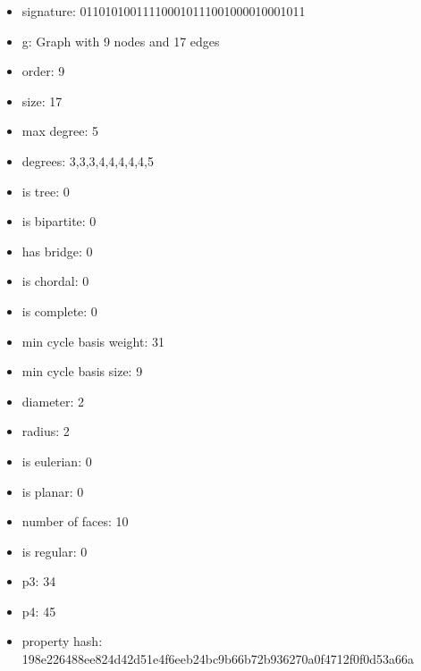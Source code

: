 \newpage
\begin{figure}
\end{figure}
\begin{itemize}
\item signature: 011010100111100010111001000010001011
\item g: Graph with 9 nodes and 17 edges
\item order: 9
\item size: 17
\item max degree: 5
\item degrees: 3,3,3,4,4,4,4,4,5
\item is tree: 0
\item is bipartite: 0
\item has bridge: 0
\item is chordal: 0
\item is complete: 0
\item min cycle basis weight: 31
\item min cycle basis size: 9
\item diameter: 2
\item radius: 2
\item is eulerian: 0
\item is planar: 0
\item number of faces: 10
\item is regular: 0
\item p3: 34
\item p4: 45
\item property hash: 198e226488ee824d42d51e4f6eeb24bc9b66b72b936270a0f4712f0f0d53a66a
\end{itemize}
